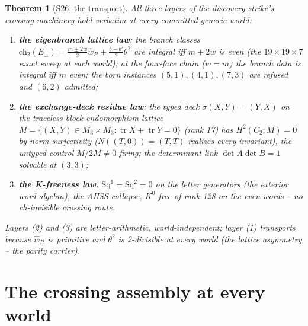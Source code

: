 \documentclass[11pt]{article}
\newtheorem{theorem}{Theorem}[section]
\begin{document}
\begin{theorem}[S26, the transport]\label{thm:s26}
All three layers of the discovery strike's crossing machinery hold
\emph{verbatim} at every committed generic world:
\begin{enumerate}
\item \textbf{the eigenbranch lattice law}: the branch classes
$\mathrm{ch}_2(E_\pm) = \frac{m\pm 2w}{2}\hat w_R + \frac{b-b'}{2}\theta^2$
are integral \emph{iff} $m+2w$ is even (the $19\times19\times7$ exact sweep at
each world); at the four-face chain ($w=m$) the branch data is integral iff
$m$ even; the born instances $(5,1),(4,1),(7,3)$ are refused and $(6,2)$
admitted;
\item \textbf{the exchange-deck residue law}: the typed deck
$\sigma(X,Y)=(Y,X)$ on the traceless block-endomorphism lattice
$M = \{(X,Y)\in M_3\times M_3 : \operatorname{tr}X+\operatorname{tr}Y=0\}$
(rank 17) has $H^2(C_2;M)=0$ by norm-surjectivity ($N((T,0))=(T,T)$ realizes
every invariant), the untyped control $M/2M\neq 0$ firing; the determinant
link $\det A\det B = 1$ solvable at $(3,3)$;
\item \textbf{the K-freeness law}: $\mathrm{Sq}^1=\mathrm{Sq}^2=0$ on the
letter generators (the exterior word algebra), the AHSS collapse,
$K^0$ free of rank 128 on the even words -- no ch-invisible crossing route.
\end{enumerate}
Layers (2) and (3) are letter-arithmetic, world-independent; layer (1)
transports because $\hat w_R$ is primitive and $\theta^2$ is 2-divisible at
every world (the lattice asymmetry -- the parity carrier).
\end{theorem}

\section{The crossing assembly at every world}
\end{document}
